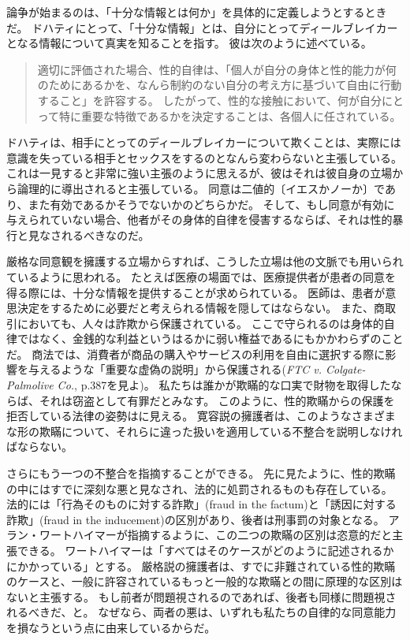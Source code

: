 \documentclass[paper=a4,book,openany]{jlreq}
\begin{document}
論争が始まるのは、「十分な情報とは何か」を具体的に定義しようとするときだ。
ドハティにとって、「十分な情報」とは、自分にとってディールブレイカーとなる情報について真実を知ることを指す。
彼は次のように述べている。

\begin{quote}
適切に評価された場合、性的自律は、「個人が自分の身体と性的能力が何のためにあるかを、なんら制約のない自分の考え方に基づいて自由に行動すること」\citep[p.70]{schulhofer92:_takin_sexual_auton_serious}を許容する。
したがって、性的な接触において、何が自分にとって特に重要な特徴であるかを決定することは、各個人に任されている。
\citep[p.730]{dougherty13:_sex_lies_consen}

\end{quote}

ドハティは、相手にとってのディールブレイカーについて欺くことは、実際には意識を失っている相手とセックスをするのとなんら変わらないと主張している。
これは一見すると非常に強い主張のように思えるが、彼はそれは彼自身の立場から論理的に導出されると主張している。
同意は二値的〔イエスかノーか〕であり、また有効であるかそうでないかのどちらかだ。
そして、もし同意が有効に与えられていない場合、他者がその身体的自律を侵害するならば、それは性的暴行と見なされるべきなのだ。

厳格な同意観を擁護する立場からすれば、こうした立場は他の文脈でも用いられているように思われる。
たとえば医療の場面では、医療提供者が患者の同意を得る際には、十分な情報を提供することが求められている。
医師は、患者が意思決定をするために必要だと考えられる情報を隠してはならない。
また、商取引においても、人々は詐欺から保護されている。
ここで守られるのは身体的自律ではなく、金銭的な利益というはるかに弱い権益であるにもかかわらずのことだ。
商法では、消費者が商品の購入やサービスの利用を自由に選択する際に影響を与えるような「重要な虚偽の説明」から保護される(\emph{FTC v. Colgate-Palmolive Co.}, p.387を見よ)。
私たちは誰かが欺瞞的な口実で財物を取得したならば、それは窃盗として有罪だとみなす。
このように、性的欺瞞からの保護を拒否している法律の姿勢はに見える\citep[][pp.69--71を見よ]{estrich87:_real_rape}。
寛容説の擁護者は、このようなさまざまな形の欺瞞について、それらに違った扱いを適用している不整合を説明しなければならない。

さらにもう一つの不整合を指摘することができる。
先に見たように、性的欺瞞の中にはすでに深刻な悪と見なされ、法的に処罰されるものも存在している。
法的には「行為そのものに対する詐欺」(fraud in the factum)と「誘因に対する詐欺」(fraud in the inducement)の区別があり、後者は刑事罰の対象となる。
アラン・ワートハイマーが指摘するように、この二つの欺瞞の区別は恣意的だと主張できる。
ワートハイマーは「すべてはそのケースがどのように記述されるかにかかっている」とする\citep[p.206]{wertheimer03:_consen_sexual_relat}。
厳格説の擁護者は、すでに非難されている性的欺瞞のケースと、一般に許容されているもっと一般的な欺瞞との間に原理的な区別はないと主張する。
もし前者が問題視されるのであれば、後者も同様に問題視されるべきだ、と。
なぜなら、両者の悪は、いずれも私たちの自律的な同意能力を損なうという点に由来しているからだ。
\end{document}
